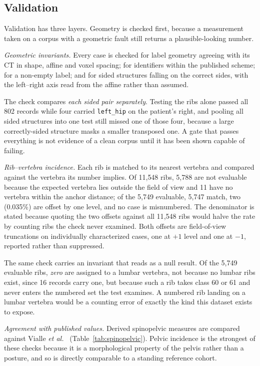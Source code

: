 \documentclass[aapm,mph,amsmath,amssymb,reprint]{revtex4-2}
\begin{document}
\subsection{Validation}
\label{sec:validation}


Validation has three layers. Geometry is checked first, because a measurement taken on a corpus with a geometric fault still returns a plausible-looking number.

\emph{Geometric invariants.} Every case is checked for label geometry agreeing with its CT
in shape, affine and voxel spacing; for identifiers within the published scheme; for a
non-empty label; and for sided structures falling on the correct sides, with the left--right
axis read from the affine rather than assumed. 

The check compares \emph{each sided pair separately}. Testing the ribs alone passed all
802 records while four carried \texttt{left\_hip} on the patient's right, and pooling all
sided structures into one test still missed one of those four, because a large
correctly-sided structure masks a smaller transposed one. A gate that passes everything is
not evidence of a clean corpus until it has been shown capable of failing.

\emph{Rib--vertebra incidence.} Each rib is matched to its nearest vertebra and compared
against the vertebra its number implies. Of 11{,}548 ribs, 5{,}788 are not evaluable
because the expected vertebra lies outside the field of view and 11 have no vertebra within
the anchor distance; of the 5{,}749 evaluable, 5{,}747 match, two (0.035\%) are offset by one
level, and no case is misnumbered. The denominator is stated because quoting the two
offsets against all 11{,}548 ribs would halve the rate by counting ribs the check never
examined. Both offsets are field-of-view truncations on individually characterized cases,
one at $+1$ level and one at $-1$, reported rather than suppressed.

The same check carries an invariant that reads as a null result. Of the 5{,}749 evaluable
ribs, \emph{zero} are assigned to a lumbar vertebra, not because no lumbar ribs exist,
since 16 records carry one, but because such a rib takes class 60 or 61 and never enters the
numbered set the test examines. A numbered rib landing on a lumbar vertebra would be a
counting error of exactly the kind this dataset exists to expose.

\emph{Agreement with published values.} Derived spinopelvic measures are compared against
Vialle \emph{et al.}~\cite{vialle2005} (Table~\ref{tab:spinopelvic}). Pelvic incidence is
the strongest of these checks because it is a morphological property of the pelvis rather
than a posture, and so is directly comparable to a standing reference cohort.
\end{document}
